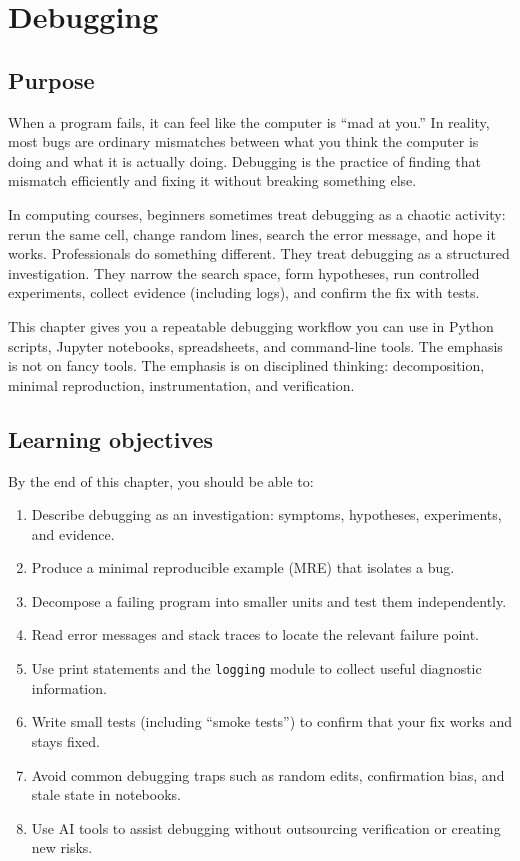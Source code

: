 
\chapter{Debugging}
\label{ch:debugging}

\section*{Purpose}
When a program fails, it can feel like the computer is ``mad at you.'' In reality, most bugs are ordinary mismatches between what you think the computer is doing and what it is actually doing. Debugging is the practice of finding that mismatch efficiently and fixing it without breaking something else.

In computing courses, beginners sometimes treat debugging as a chaotic activity: rerun the same cell, change random lines, search the error message, and hope it works. Professionals do something different. They treat debugging as a structured investigation. They narrow the search space, form hypotheses, run controlled experiments, collect evidence (including logs), and confirm the fix with tests.

This chapter gives you a repeatable debugging workflow you can use in Python scripts, Jupyter notebooks, spreadsheets, and command-line tools. The emphasis is not on fancy tools. The emphasis is on disciplined thinking: decomposition, minimal reproduction, instrumentation, and verification.

\section*{Learning objectives}
By the end of this chapter, you should be able to:
\begin{enumerate}[noitemsep]
  \item Describe debugging as an investigation: symptoms, hypotheses, experiments, and evidence.
  \item Produce a minimal reproducible example (MRE) that isolates a bug.
  \item Decompose a failing program into smaller units and test them independently.
  \item Read error messages and stack traces to locate the relevant failure point.
  \item Use print statements and the \texttt{logging} module to collect useful diagnostic information.
  \item Write small tests (including ``smoke tests'') to confirm that your fix works and stays fixed.
  \item Avoid common debugging traps such as random edits, confirmation bias, and stale state in notebooks.
  \item Use AI tools to assist debugging without outsourcing verification or creating new risks.
\end{enumerate}

